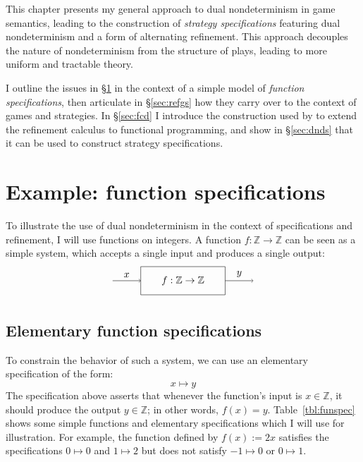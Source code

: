 \documentclass[11pt,oneside,draft]{book}
\theoremstyle{definition}
\begin{document}
This chapter presents my general approach
to dual nondeterminism in game semantics,
leading to the construction of \emph{strategy specifications}
featuring dual nondeterminism and a form of alternating refinement.
This approach decouples the nature of nondeterminism
from the structure of plays,
leading to more uniform and tractable theory.

I outline the issues in \S\ref{sec:fspec}
in the context of a simple model of \emph{function specifications},
then articulate in \S\ref{sec:refgs}
how they carry over to the context of games and strategies.
In \S\ref{sec:fcd} I introduce the construction used by \citet{augtyp}
to extend the refinement calculus to functional programming,
and show in \S\ref{sec:dnds} that it can be used
to construct strategy specifications.

\section{Example: function specifications} \label{sec:fspec} %

To illustrate the use of dual nondeterminism
in the context of specifications and refinement,
I will use functions on integers.
A function $f : \mathbb{Z} \rightarrow \mathbb{Z}$
can be seen as a simple system,
which accepts a single input and produces a single output:
\[
  \begin{tikzpicture}[scale=0.5]
    \draw (-3, -1) rectangle (3, 1);
    \node at (0,0) {$f : \mathbb{Z} \rightarrow \mathbb{Z}$};
    \draw[->] (-5,0) -- node[above] {$x$} (-3,0);
    \draw[->] (3,0) -- node[above] {$y$} (5,0);
  \end{tikzpicture}
\]

\subsection{Elementary function specifications} \label{sec:funspec} %

To constrain the behavior of such a system,
we can use an elementary specification of the form:
\[
  x \mapsto y
\]
The specification above asserts that
whenever the function's input is $x \in \mathbb{Z}$,
it should produce the output $y \in \mathbb{Z}$;
in other words, $f(x) = y$.
Table~\ref{tbl:funspec}
shows some simple functions
and elementary specifications
which I will use for illustration.
For example,
the function defined by $f(x) := 2x$
satisfies the specifications
$0 \mapsto 0$ and $1 \mapsto 2$
but does not satisfy $-1 \mapsto 0$ or $0 \mapsto 1$.
\end{document}
